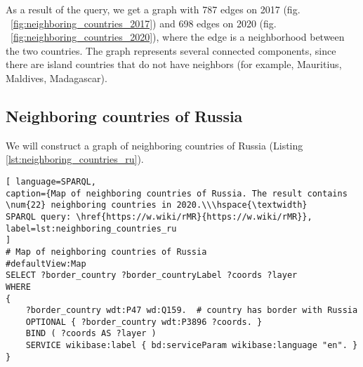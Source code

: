 
\begin{figure*}
	{
		\setlength{\fboxsep}{0pt}%
		\setlength{\fboxrule}{1pt}%
	}
	\caption{Neighboring countries graph, 2017.
	}%
	\label{fig:neighboring_countries_2017}%
\end{figure*}

\begin{figure*}
	{
		\setlength{\fboxsep}{0pt}%
		\setlength{\fboxrule}{1pt}%
	}
	\caption{Neighboring countries graph, 2020.
	}%
	\label{fig:neighboring_countries_2020}%
\end{figure*}

As a result of the query, we get a graph with 787 edges on 2017 (fig. ~\ref{fig:neighboring_countries_2017}) and 698 edges on 2020 (fig. ~\ref{fig:neighboring_countries_2020}), where the edge is a neighborhood between the two countries. The graph represents several connected components, since there are island countries that do not have neighbors (for example, Mauritius, Maldives, Madagascar).

\subsection{Neighboring countries of Russia}

We will construct a graph of neighboring countries of Russia (Listing \ref{lst:neighboring_countries_ru}).

\begin{lstlisting}[ language=SPARQL, 
caption={Map of neighboring countries of Russia. The result contains \num{22} neighboring countries in 2020.\\\hspace{\textwidth}
SPARQL query: \href{https://w.wiki/rMR}{https://w.wiki/rMR}},
label=lst:neighboring_countries_ru
]
# Map of neighboring countries of Russia
#defaultView:Map
SELECT ?border_country ?border_countryLabel ?coords ?layer
WHERE 
{
	?border_country wdt:P47 wd:Q159.  # country has border with Russia
	OPTIONAL { ?border_country wdt:P3896 ?coords. }
	BIND ( ?coords AS ?layer )
	SERVICE wikibase:label { bd:serviceParam wikibase:language "en". }
}
\end{lstlisting}

